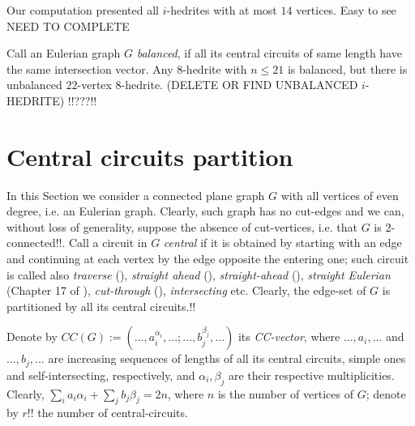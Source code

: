 \documentclass[12pt]{article}
\begin{document}
Our computation presented all $i$-hedrites with at most $14$ vertices. Easy to see NEED TO COMPLETE





Call an Eulerian graph $G$ {\it balanced}, if all its central circuits of
same length have the same intersection vector.
Any $8$-hedrite with $n \le 21$ is balanced, but there is unbalanced $22$-vertex $8$-hedrite. (DELETE OR FIND UNBALANCED $i$-HEDRITE)
!!???!!















\section{Central circuits partition}

In this Section we consider a connected plane graph $G$ with all vertices of 
even degree, i.e. an Eulerian graph. Clearly, such graph has no cut-edges and
we can, without loss of generality, suppose the absence of 
cut-vertices, i.e. that $G$ is $2$-connected!!. 
Call a circuit in $G$ {\it central} if it is obtained by starting with an
edge and continuing at each vertex by the edge opposite the entering one; such 
circuit is called also {\em traverse} 
(\cite{GK}), {\em straight ahead} (\cite{Ha}),  
{\em straight-ahead} (\cite{PTZ}), {\em straight Eulerian}
(Chapter 17 of \cite{God}), {\em cut-through}
(\cite{Je}),
{\em intersecting} etc. Clearly, the edge-set of 
$G$ is partitioned by all its central circuits.!!




Denote by 
$CC(G):=(...,a_i^{\alpha_i},...;...,b_j^{\beta_j},...)$ its {\it CC-vector}, 
where $...,a_i,...$ and  $...,b_j,...$ are increasing sequences of lengths of 
all its central circuits, simple ones and self-intersecting, respectively, 
and $\alpha_i, \beta_j$ are their respective multiplicities.
Clearly, $\sum_{i} a_i{\alpha_i}+ \sum_{j} b_j{\beta_j}=2n$, where 
$n$ is the number of vertices of $G$; denote by $r$!! the number of 
central-circuits.
\end{document}
